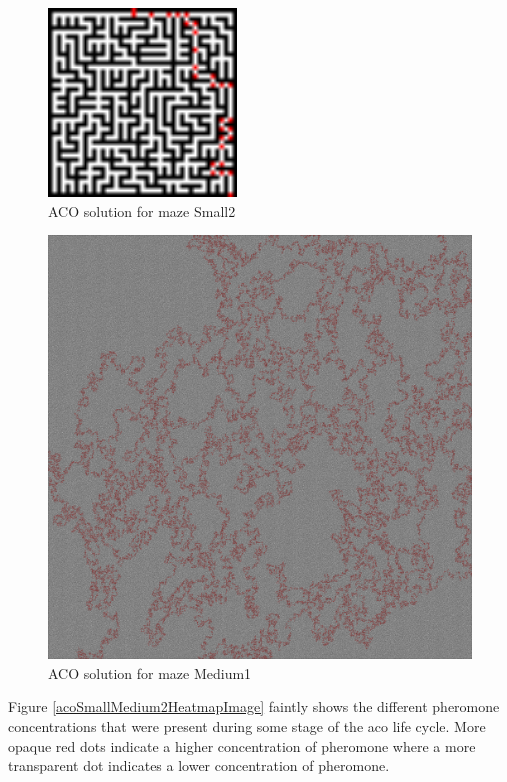 \documentclass[hidelinks,english,conference]{IEEEtran}
\begin{document}
    \begin{figure}
    \centering
    \includegraphics[width=5cm]{Small2_Solution_ACO.png}
    \caption{ACO solution for maze Small2}
    \label{acoSmall2SolutionImage}
    \end{figure}
  	
    \begin{figure}
    \centering
    \includegraphics[width=\linewidth]{Medium1_Solution_ACO.png}
    \caption{ACO solution for maze Medium1}
    \label{acoMedium1SolutionImage}
    \end{figure}
    
    Figure \ref{acoSmallMedium2HeatmapImage} faintly shows the different pheromone concentrations that were present during some stage of the \gls{aco} life cycle. More opaque red dots indicate a higher concentration of pheromone where a more transparent dot indicates a lower concentration of pheromone. 
  	
\end{document}
